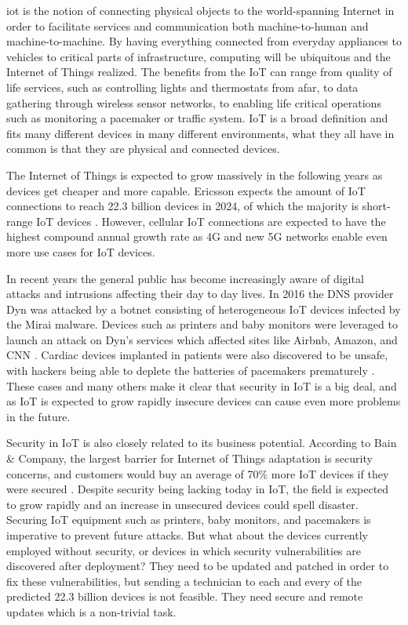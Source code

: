 \documentclass[0-thesis.tex]{subfiles}
\begin{document}
\gls{iot} is the notion of connecting physical objects to the
world-spanning Internet in order to facilitate services and communication both
machine-to-human and machine-to-machine. By having everything connected from everyday
appliances to vehicles to critical parts of infrastructure, computing will be ubiquitous
and the Internet of Things realized. The benefits from the IoT can range from quality of
life services, such as controlling lights and thermostats from afar, to data gathering
through wireless sensor networks, to enabling life critical operations such as monitoring
a pacemaker or traffic system. IoT is a broad definition and fits many different devices
in many different environments, what they all have in common is that they are physical and
connected devices.

The Internet of Things is expected to grow massively in the following years as devices get
cheaper and more capable. Ericsson expects the amount of IoT connections to reach 22.3
billion devices in 2024, of which the majority is short-range IoT devices
\parencite{ericsson-mobility-report}. However, cellular IoT connections are expected to
have the highest compound annual growth rate as 4G and new 5G networks enable even more
use cases for IoT devices.

In recent years the general public has become increasingly aware of digital attacks and
intrusions affecting their day to day lives. In 2016 the DNS provider Dyn was attacked by
a botnet consisting of heterogeneous IoT devices infected by the Mirai malware. Devices
such as printers and baby monitors were leveraged to launch an attack on Dyn's services
which affected sites like Airbnb, Amazon, and CNN \parencite{perlroth_2016}. Cardiac
devices implanted in patients were also discovered to be unsafe, with hackers being able
to deplete the batteries of pacemakers prematurely \parencite{hern_2017}. These cases and
many others make it clear that security in IoT is a big deal, and as IoT is expected to
grow rapidly insecure devices can cause even more problems in the future.

Security in IoT is also closely related to its business potential. According to Bain \&
Company, the largest barrier for Internet of Things adaptation is security concerns, and
customers would buy an average of 70\% more IoT devices if they were secured
\parencite{ali_bosche_ford_2018}. Despite security being lacking today in IoT, the field
is expected to grow rapidly and an increase in unsecured devices could spell disaster.
Securing IoT equipment such as printers, baby monitors, and pacemakers is imperative to
prevent future attacks. But what about the devices currently employed without security, or
devices in which security vulnerabilities are discovered after deployment? They need to be
updated and patched in order to fix these vulnerabilities, but sending a technician to
each and every of the predicted 22.3 billion devices is not feasible. They need secure and
remote updates which is a non-trivial task.
\end{document}
